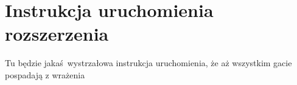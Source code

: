 \chapter{Instrukcja uruchomienia rozszerzenia}
Tu będzie jakaś wystrzałowa instrukcja uruchomienia, że aż wszystkim gacie pospadają z wrażenia